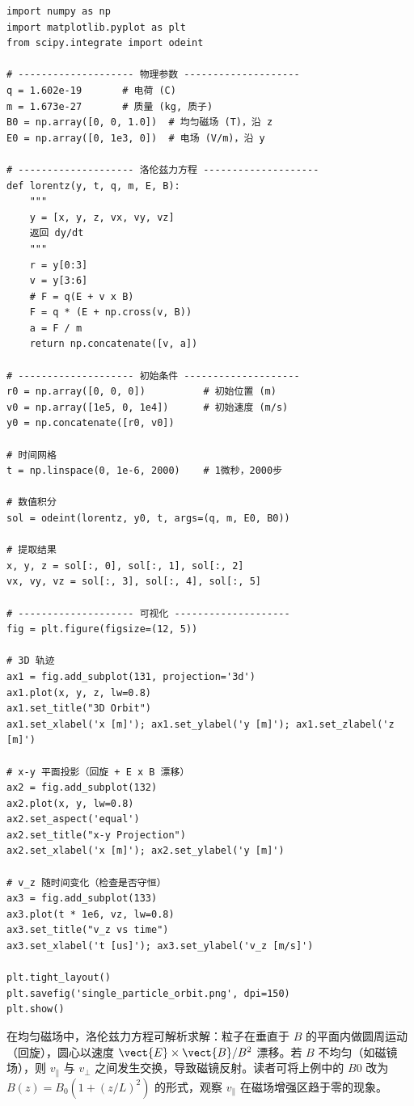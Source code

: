 \begin{verbatim}
import numpy as np
import matplotlib.pyplot as plt
from scipy.integrate import odeint

# -------------------- 物理参数 --------------------
q = 1.602e-19       # 电荷 (C)
m = 1.673e-27       # 质量 (kg, 质子)
B0 = np.array([0, 0, 1.0])  # 均匀磁场 (T)，沿 z
E0 = np.array([0, 1e3, 0])  # 电场 (V/m)，沿 y

# -------------------- 洛伦兹力方程 --------------------
def lorentz(y, t, q, m, E, B):
    """
    y = [x, y, z, vx, vy, vz]
    返回 dy/dt
    """
    r = y[0:3]
    v = y[3:6]
    # F = q(E + v x B)
    F = q * (E + np.cross(v, B))
    a = F / m
    return np.concatenate([v, a])

# -------------------- 初始条件 --------------------
r0 = np.array([0, 0, 0])          # 初始位置 (m)
v0 = np.array([1e5, 0, 1e4])      # 初始速度 (m/s)
y0 = np.concatenate([r0, v0])

# 时间网格
t = np.linspace(0, 1e-6, 2000)    # 1微秒，2000步

# 数值积分
sol = odeint(lorentz, y0, t, args=(q, m, E0, B0))

# 提取结果
x, y, z = sol[:, 0], sol[:, 1], sol[:, 2]
vx, vy, vz = sol[:, 3], sol[:, 4], sol[:, 5]

# -------------------- 可视化 --------------------
fig = plt.figure(figsize=(12, 5))

# 3D 轨迹
ax1 = fig.add_subplot(131, projection='3d')
ax1.plot(x, y, z, lw=0.8)
ax1.set_title("3D Orbit")
ax1.set_xlabel('x [m]'); ax1.set_ylabel('y [m]'); ax1.set_zlabel('z [m]')

# x-y 平面投影（回旋 + E x B 漂移）
ax2 = fig.add_subplot(132)
ax2.plot(x, y, lw=0.8)
ax2.set_aspect('equal')
ax2.set_title("x-y Projection")
ax2.set_xlabel('x [m]'); ax2.set_ylabel('y [m]')

# v_z 随时间变化（检查是否守恒）
ax3 = fig.add_subplot(133)
ax3.plot(t * 1e6, vz, lw=0.8)
ax3.set_title("v_z vs time")
ax3.set_xlabel('t [us]'); ax3.set_ylabel('v_z [m/s]')

plt.tight_layout()
plt.savefig('single_particle_orbit.png', dpi=150)
plt.show()
\end{verbatim}

\begin{insight}{}{}
在均匀磁场中，洛伦兹力方程可解析求解：粒子在垂直于 $B$ 的平面内做圆周运动（回旋），圆心以速度 $\vect{E}\times\vect{B}/B^2$ 漂移。若 $B$ 不均匀（如磁镜场），则 $v_\parallel$ 与 $v_\perp$ 之间发生交换，导致磁镜反射。读者可将上例中的 $B0$ 改为 $B(z)=B_0(1+(z/L)^2)$ 的形式，观察 $v_\parallel$ 在磁场增强区趋于零的现象。
\end{insight}


